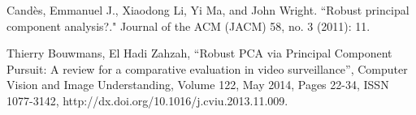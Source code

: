 \documentclass[conference]{IEEEtran}
\begin{document}
%
%
%
\begin{thebibliography}{7}

Candès, Emmanuel J., Xiaodong Li, Yi Ma, and John Wright. ``Robust principal component analysis?." Journal of the ACM (JACM) 58, no. 3 (2011): 11.

Thierry Bouwmans, El Hadi Zahzah, ``Robust PCA via Principal Component Pursuit: A review for a comparative evaluation in video surveillance'', Computer Vision and Image Understanding, Volume 122, May 2014, Pages 22-34, ISSN 1077-3142, http://dx.doi.org/10.1016/j.cviu.2013.11.009.


\end{thebibliography}
\end{document}
